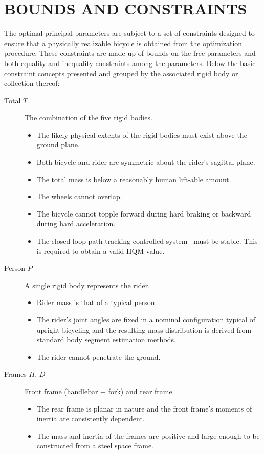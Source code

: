 \documentclass{bmd2019p}
\begin{document}
\section{BOUNDS AND CONSTRAINTS}
%
The optimal principal parameters are subject to a set of constraints designed
to ensure that a physically realizable bicycle is obtained from the
optimization procedure. These constraints are made up of bounds on the free
parameters and both equality and inequality constraints among the parameters.
Below the basic constraint concepts presented and grouped by the associated
rigid body or collection thereof:
%
\begin{description}
  \item[Total $T$] The combination of the five rigid bodies.
    \begin{itemize}
      \item The likely physical extents of the rigid bodies must exist above
        the ground plane.
      \item Both bicycle and rider are symmetric about the rider's sagittal
        plane.
      \item The total mass is below a reasonably human lift-able amount.
      \item The wheels cannot overlap.
      \item The bicycle cannot topple forward during hard braking or backward
        during hard acceleration.
      \item The closed-loop path tracking controlled system~\cite{Hess2012}
        must be stable. This is required to obtain a valid HQM value.
    \end{itemize}

  \item[Person $P$] A single rigid body represents the rider.
    \begin{itemize}
      \item Rider mass is that of a typical person.
      \item The rider's joint angles are fixed in a nominal configuration
        typical of upright bicycling and the resulting mass distribution is
        derived from standard body segment estimation methods.
      \item The rider cannot penetrate the ground.
    \end{itemize}

  \item[Frames $H$, $D$] Front frame (handlebar + fork) and rear frame
    \begin{itemize}
      \item The rear frame is planar in nature and the front frame's moments of
        inertia are consistently dependent.
      \item The mass and inertia of the frames are positive and large enough to
        be constructed from a steel space frame.
    \end{itemize}


\end{description}
\end{document}
